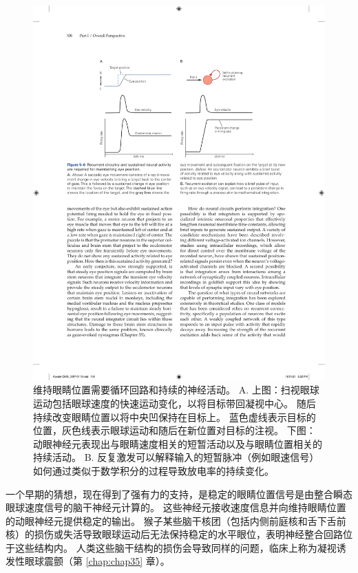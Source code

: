\begin{figure}[htbp]
	\centering
	\includegraphics[width=1.0\linewidth]{chap05/fig_5_6}
	\caption{维持眼睛位置需要循环回路和持续的神经活动。 
		A. 上图：扫视眼球运动包括眼球速度的快速运动变化，以将目标带回凝视中心。 
		随后持续改变眼睛位置以将中央凹保持在目标上。 
		蓝色虚线表示目标的位置，灰色线表示眼球运动和随后在新位置对目标的注视。 
		下图：动眼神经元表现出与眼睛速度相关的短暂活动以及与眼睛位置相关的持续活动。 
		B. 反复激发可以解释输入的短暂脉冲（例如眼速信号）如何通过类似于数学积分的过程导致放电率的持续变化。}
	\label{fig:5_6}
\end{figure}


一个早期的猜想，现在得到了强有力的支持，是稳定的眼睛位置信号是由整合瞬态眼球速度信号的脑干神经元计算的。 
这些神经元接收速度信息并向维持眼睛位置的动眼神经元提供稳定的输出。 
猴子某些脑干核团（包括内侧前庭核和舌下舌前核）的损伤或失活导致眼球运动后无法保持稳定的水平眼位，表明神经整合回路位于这些结构内。 
人类这些脑干结构的损伤会导致同样的问题，临床上称为凝视诱发性眼球震颤（第 \ref{chap:chap35} 章）。

